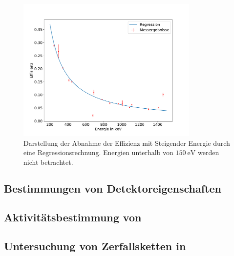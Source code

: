 \begin{figure}
\centering
\includegraphics[width=0.8\textwidth]{python/plots/effizienz.pdf}
\caption{Darstellung der Abnahme der Effizienz mit Steigender Energie durch eine Regressionsrechnung. Energien unterhalb von $\SI{150}{\electronvolt}$ werden nicht betrachtet.}
\label{fig:Effizienz}
\end{figure}
\subsection{Bestimmungen von Detektoreigenschaften}
\label{subsec:a2}






\subsection{Aktivitätsbestimmung von }
\label{subsec:a3}

\subsection{Untersuchung von Zerfallsketten in }
\label{subsec:a4}



